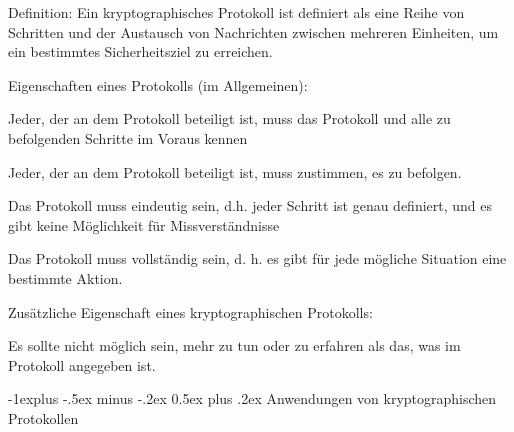 \documentclass[a4paper]{article}
\makeatletter
\renewcommand{\subsection}{\@startsection{subsection}{2}{0mm}%
 {-1explus -.5ex minus -.2ex}%
 {0.5ex plus .2ex}%
 {\normalfont\normalsize\bfseries}}
\makeatother
\begin{document}
\begin{multicols}{3}
      \begin{itemize*}
            \item Definition: Ein kryptographisches Protokoll ist definiert als eine
            Reihe von Schritten und der Austausch von Nachrichten zwischen
            mehreren Einheiten, um ein bestimmtes Sicherheitsziel zu erreichen.
            \item Eigenschaften eines Protokolls (im Allgemeinen):
            \begin{itemize*}
                  \item Jeder, der an dem Protokoll beteiligt ist, muss das Protokoll und alle zu befolgenden Schritte im Voraus kennen
                  \item Jeder, der an dem Protokoll beteiligt ist, muss zustimmen, es zu befolgen.
                  \item Das Protokoll muss eindeutig sein, d.h. jeder Schritt ist genau definiert, und es gibt keine Möglichkeit für Missverständnisse
                  \item Das Protokoll muss vollständig sein, d. h. es gibt für jede mögliche Situation eine bestimmte Aktion.
            \end{itemize*}
            \item Zusätzliche Eigenschaft eines kryptographischen Protokolls:
            \begin{itemize*}
                  \item Es sollte nicht möglich sein, mehr zu tun oder zu erfahren als das, was im Protokoll angegeben ist.
            \end{itemize*}
      \end{itemize*}


      \subsection{Anwendungen von kryptographischen
            Protokollen}


\end{multicols}
\end{document}
